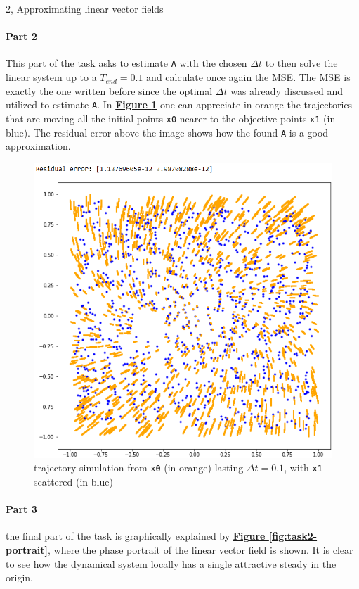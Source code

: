 \documentclass[10pt,a4paper]{article}
\begin{document}
\begin{task}{2, Approximating linear vector fields}
\paragraph{Part 2}
This part of the task asks to estimate \texttt{A} with the chosen $\Delta t$ to then solve the linear system up to a $T_{end} = 0.1$ and calculate once again the MSE. The MSE is exactly the one written before since the optimal $\Delta t$ was already discussed and utilized to estimate \texttt{A}. In \textbf{\hyperref[fig:task2-traj]{Figure \ref{fig:task2-traj}}} one can appreciate in orange the trajectories that are moving all the initial points \texttt{x0} nearer to the objective points \texttt{x1} (in blue). The residual error above the image shows how the found \texttt{A} is a good approximation.
\begin{figure}[H]
    \centering
    \includegraphics[scale=0.5]{images/task2_part2.png}
    \caption{trajectory simulation from \texttt{x0} (in orange) lasting $\Delta t = 0.1$, with \texttt{x1} scattered (in blue)}
    \label{fig:task2-traj}
\end{figure}
\paragraph{Part 3} the final part of the task is graphically explained by \textbf{\hyperref[fig:task2-portrait]{Figure \ref{fig:task2-portrait}}}, where the phase portrait of the linear vector field is shown. It is clear to see how the dynamical system locally has a single attractive steady in the origin. 


\end{task}
\end{document}
